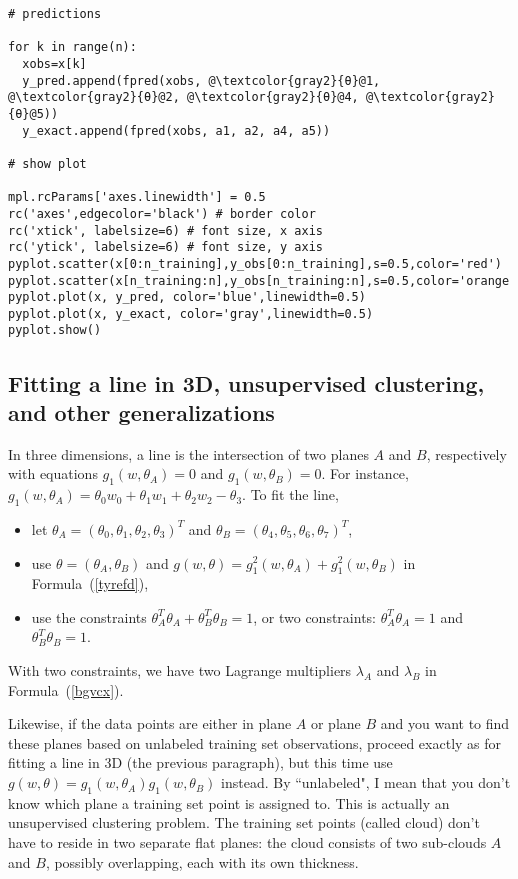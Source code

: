 \documentclass[oneside,10pt]{book}
\begin{document}
\begin{lstlisting}[escapechar=@]
# predictions

for k in range(n):
  xobs=x[k]
  y_pred.append(fpred(xobs, @\textcolor{gray2}{θ}@1, @\textcolor{gray2}{θ}@2, @\textcolor{gray2}{θ}@4, @\textcolor{gray2}{θ}@5))
  y_exact.append(fpred(xobs, a1, a2, a4, a5))

# show plot

mpl.rcParams['axes.linewidth'] = 0.5
rc('axes',edgecolor='black') # border color
rc('xtick', labelsize=6) # font size, x axis
rc('ytick', labelsize=6) # font size, y axis
pyplot.scatter(x[0:n_training],y_obs[0:n_training],s=0.5,color='red')
pyplot.scatter(x[n_training:n],y_obs[n_training:n],s=0.5,color='orange')
pyplot.plot(x, y_pred, color='blue',linewidth=0.5)
pyplot.plot(x, y_exact, color='gray',linewidth=0.5)
pyplot.show()
\end{lstlisting}

\subsection{Fitting a line in 3D, unsupervised clustering, and other generalizations}

In three dimensions, a line is the intersection of two planes $A$ and $B$, respectively with equations
$g_1(w,\theta_A)=0$ and $g_1(w,\theta_B)=0$. For instance, $g_1(w,\theta_A)=\theta_0 w_0 + \theta_1 w_1 +\theta_2 w_2
- \theta_3$. To fit the line, \vspace{1ex}
\begin{itemize}
\item let $\theta_A=(\theta_0,\theta_1,\theta_2,\theta_3)^T$ and $\theta_B=(\theta_4,\theta_5,\theta_6,\theta_7)^T$,
\item use $\theta=(\theta_A,\theta_B)$ and $g(w,\theta)=g_1^2(w,\theta_A)+g_1^2(w,\theta_B)$ in Formula~(\ref{tyrefd}),
\item use the constraints  $\theta_A^T\theta_A + \theta_B^T\theta_B=1$, or two constraints: $\theta_A^T\theta_A=1$ and $\theta_B^T\theta_B=1$.
\end{itemize}
 With two constraints, we have two
Lagrange multipliers $\lambda_A$ and $\lambda_B$ in Formula~(\ref{bgvcx}).

Likewise, if the data points are either in plane $A$ or plane $B$ and you want to find these planes based on unlabeled training set observations, proceed exactly as for fitting a line in 3D (the
 previous paragraph), but this time use $g(w,\theta)=g_1(w,\theta_A)g_1(w,\theta_B)$ instead. By ``unlabeled", I mean that you don't know which plane a training set point is assigned to.   This is actually an unsupervised clustering problem. The \textcolor{index}{training set} points (called cloud) don't have to reside
 in two separate flat planes: the cloud consists of two sub-clouds $A$ and $B$, possibly overlapping, each with its own thickness.
\end{document}
